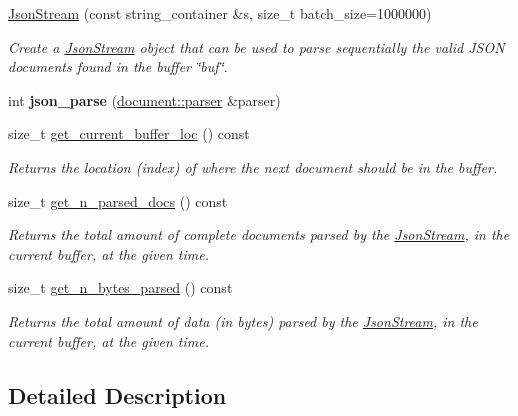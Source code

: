 \begin{DoxyCompactItemize}
\item 
\hyperlink{classsimdjson_1_1_json_stream_ac7ab1f7dd9d839e155f32aa70ca3826d}{Json\+Stream} (const string\+\_\+container \&s, size\+\_\+t batch\+\_\+size=1000000)
\begin{DoxyCompactList}\small\item\em Create a \hyperlink{classsimdjson_1_1_json_stream}{Json\+Stream} object that can be used to parse sequentially the valid J\+S\+ON documents found in the buffer \char`\"{}buf\char`\"{}. \end{DoxyCompactList}\item 
\mbox{\label{classsimdjson_1_1_json_stream_ab386509a4a926e325e90bab1b5a96e5e}} 
int {\bfseries json\+\_\+parse} (\hyperlink{classsimdjson_1_1document_1_1parser}{document\+::parser} \&parser)
\item 
size\+\_\+t \hyperlink{classsimdjson_1_1_json_stream_a01493e28b0606bcef1e03c233214382b}{get\+\_\+current\+\_\+buffer\+\_\+loc} () const
\begin{DoxyCompactList}\small\item\em Returns the location (index) of where the next document should be in the buffer. \end{DoxyCompactList}\item 
size\+\_\+t \hyperlink{classsimdjson_1_1_json_stream_a160e592d44374cc21c12a58a1648196b}{get\+\_\+n\+\_\+parsed\+\_\+docs} () const
\begin{DoxyCompactList}\small\item\em Returns the total amount of complete documents parsed by the \hyperlink{classsimdjson_1_1_json_stream}{Json\+Stream}, in the current buffer, at the given time. \end{DoxyCompactList}\item 
size\+\_\+t \hyperlink{classsimdjson_1_1_json_stream_ac63006b60b0446cd20dfc102131e8a98}{get\+\_\+n\+\_\+bytes\+\_\+parsed} () const
\begin{DoxyCompactList}\small\item\em Returns the total amount of data (in bytes) parsed by the \hyperlink{classsimdjson_1_1_json_stream}{Json\+Stream}, in the current buffer, at the given time. \end{DoxyCompactList}\end{DoxyCompactItemize}


\subsection{Detailed Description}

